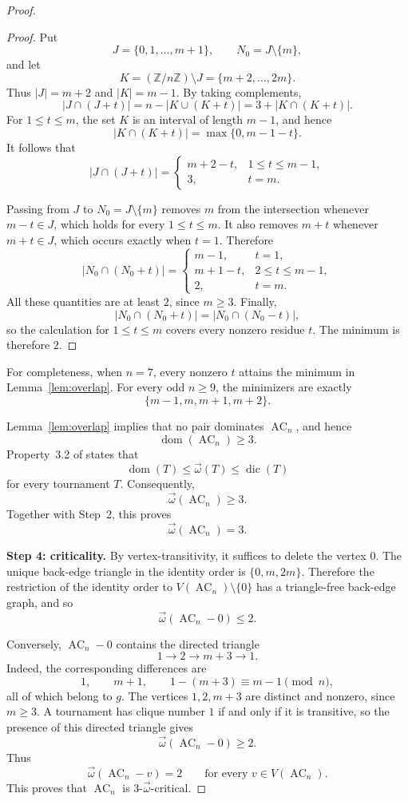 \documentclass[11pt]{article}
\newcommand{\Z}{\mathbb{Z}}
\newcommand{\tomega}{\vec{\omega}}
\newcommand{\domn}{\operatorname{dom}}
\newcommand{\dic}{\operatorname{dic}}
\newcommand{\AC}{\operatorname{AC}}
\begin{document}
\begin{proof}
\begin{proof}
Put
\[
  J=\{0,1,\ldots,m+1\},
  \qquad
  N_0=J\setminus\{m\},
\]
and let
\[
  K=(\Z/n\Z)\setminus J=\{m+2,\ldots,2m\}.
\]
Thus \(|J|=m+2\) and \(|K|=m-1\). By taking complements,
\[
  |J\cap(J+t)|
  =
  n-|K\cup(K+t)|
  =
  3+|K\cap(K+t)|.
\]
For \(1\leq t\leq m\), the set \(K\) is an interval of length
\(m-1\), and hence
\[
  |K\cap(K+t)|=\max\{0,m-1-t\}.
\]
It follows that
\[
  |J\cap(J+t)|
  =
  \begin{cases}
    m+2-t, & 1\leq t\leq m-1,\\
    3,     & t=m.
  \end{cases}
\]

Passing from \(J\) to \(N_0=J\setminus\{m\}\) removes \(m\) from the
intersection whenever \(m-t\in J\), which holds for every
\(1\leq t\leq m\). It also removes \(m+t\) whenever \(m+t\in J\),
which occurs exactly when \(t=1\). Therefore
\[
  |N_0\cap(N_0+t)|
  =
  \begin{cases}
    m-1,   & t=1,\\
    m+1-t, & 2\leq t\leq m-1,\\
    2,     & t=m.
  \end{cases}
\]
All these quantities are at least \(2\), since \(m\geq3\).
Finally,
\[
  |N_0\cap(N_0+t)|
  =
  |N_0\cap(N_0-t)|,
\]
so the calculation for \(1\leq t\leq m\) covers every nonzero
residue \(t\). The minimum is therefore \(2\).
\end{proof}

For completeness, when \(n=7\), every nonzero \(t\) attains the
minimum in Lemma~\ref{lem:overlap}. For every odd \(n\geq9\), the
minimizers are exactly
\[
  \{m-1,m,m+1,m+2\}.
\]

Lemma~\ref{lem:overlap} implies that no pair dominates \(\AC_n\), and
hence
\[
  \domn(\AC_n)\geq3.
\]
Property~3.2 of \cite{AACL} states that
\[
  \domn(T)\leq\tomega(T)\leq\dic(T)
\]
for every tournament \(T\). Consequently,
\[
  \tomega(\AC_n)\geq3.
\]
Together with Step~2, this proves
\[
  \tomega(\AC_n)=3.
\]

\medskip
\noindent
\textbf{Step 4: criticality.}
By vertex-transitivity, it suffices to delete the vertex \(0\). The
unique back-edge triangle in the identity order is \(\{0,m,2m\}\).
Therefore the restriction of the identity order to
\(V(\AC_n)\setminus\{0\}\) has a triangle-free back-edge graph, and
so
\[
  \tomega(\AC_n-0)\leq2.
\]

Conversely, \(\AC_n-0\) contains the directed triangle
\[
  1\longrightarrow2\longrightarrow m+3\longrightarrow1.
\]
Indeed, the corresponding differences are
\[
  1,\qquad m+1,\qquad
  1-(m+3)\equiv m-1\pmod n,
\]
all of which belong to \(g\). The vertices \(1,2,m+3\) are distinct
and nonzero, since \(m\geq3\). A tournament has clique number \(1\)
if and only if it is transitive, so the presence of this directed
triangle gives
\[
  \tomega(\AC_n-0)\geq2.
\]
Thus
\[
  \tomega(\AC_n-v)=2
  \qquad\text{for every }v\in V(\AC_n).
\]
This proves that \(\AC_n\) is \(3\)-\(\tomega\)-critical.


\end{proof}
\end{document}
